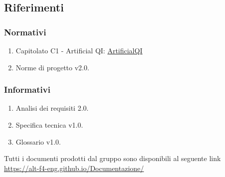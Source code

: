 \subsection{Riferimenti}

\subsubsection{Normativi}

\begin{enumerate}
    \item Capitolato C1 - Artificial QI: \href{https://www.math.unipd.it/~tullio/IS-1/2024/Progetto/C1.pdf}{ArtificialQI}

    \item Norme di progetto v2.0.
\end{enumerate}

\subsubsection{Informativi}

\begin{enumerate}
    \item Analisi dei requisiti 2.0.
    \item Specifica tecnica v1.0.
    \item Glossario v1.0.
\end{enumerate}
Tutti i documenti prodotti dal gruppo sono disponibili al seguente link \href{https://alt-f4-eng.github.io/Documentazione/}{https://alt-f4-eng.github.io/Documentazione/}